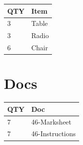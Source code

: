 \documentclass[10pt, A5]{article}
\begin{document}
\begin{framed}
\begin{minipage}{\textwidth}
\begin{multicols}{2}
		
	\begin{center}
			\begin{tabular}{p{2cm}p{4cm}}


				\textbf{QTY} & \textbf{Item} \\\toprule
												3&Table\\\midrule
												3&Radio\\\midrule
												6&Chair\\\midrule
								\end{tabular}

			\end{center}

		
		\vfill\null
		\columnbreak

			\section*{\faFile \: Docs}
		 	\begin{center}
			\begin{tabular}{p{2cm}p{4cm}}

			\textbf{QTY} & \textbf{Doc} \\\toprule
										7&46-Marksheet\\\midrule
										7&46-Instructions\\\midrule
							\end{tabular}
			\end{center}
	

		\vfill\null

		\end{multicols}
\end{minipage}
\end{framed}
\end{document}
